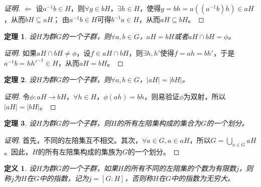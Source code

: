 \documentclass{article}
\newtheorem{Def}{定义}
\newtheorem{Thm}{定理}
\begin{document}
\begin{CJK*}{UTF8}{gbsn}
\begin{proof}[证明]
  $\Leftarrow$
  设$a^{-1}b\in H$，则$\forall g\in bH$，$\exists h\in H$，使得$g=bh=a((a^{-1}b)h)\in aH$，从而$bH\subseteq aH$；
  由$a^{-1}b\in H$可得$b^{-1}a\in H$，从而$aH\subseteq bH$。
\end{proof}
\begin{Thm}
  设$H$为群$G$的一个子群，则$\forall a,b\in G$，$aH=bH$或者$aH\cap bH=\phi$。
\end{Thm}
\begin{proof}[证明]
  如果$aH\cap bH\neq \phi$，设$f\in aH\cap bH$，则$\exists h,h'$使得$f=ah=bh'$，于是$a^{-1}b=hh'^{-1}\in H$，从而$aH=bH$。
\end{proof}
\begin{Thm}
  设$H$为群$G$的一个子群，则$\forall a,b\in G$，$|aH|=|bH|$。
\end{Thm}
\begin{proof}[证明]
  令$\phi:aH\to bH$，$\forall h\in H$，$\phi(ah)=bh$，则易验证$\phi$为双射，所以$|aH|=|bH|$。
\end{proof}
\begin{Thm}
  设$H$为群$G$的一个子群，则$H$的所有左陪集构成的集合为$G$的一个划分。
\end{Thm}
\begin{proof}[证明]
  首先，不同的左陪集互不相交。其次，$\forall a\in G,a\in aH$，所以$G=\bigcup_{a\in G}aH$。因此，$H$的所有左陪集构成的集族为$G$的一个划分。
\end{proof}
\begin{Def}
  设$H$为群$G$的一个子群，如果$H$的所有不同的左陪集的个数为有限数$j$，则称$j$为$H$在$G$中的指数，记为$j=[G:H]$，否则称$H$在$G$中的指数为无穷大。
\end{Def}


\end{CJK*}
\end{document}
